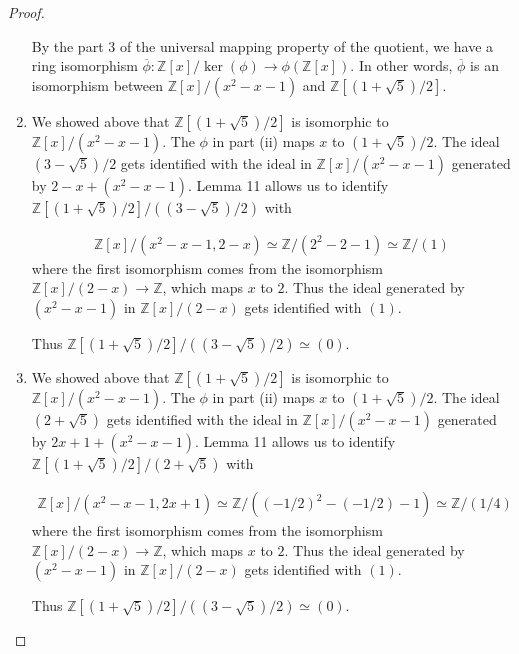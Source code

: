 \documentclass[12pt, psamsfonts]{amsart}
\theoremstyle{definition}
\theoremstyle{remark}
\numberwithin{equation}{section}
\begin{document}
\begin{proof}
\begin{enumerate}
      By the part 3 of the universal mapping property of the quotient, we have a ring isomorphism $\overline{\phi}: \mathbb{Z}[x]/\ker(\phi) \rightarrow \phi(\mathbb{Z}[x])$.
      In other words, $\overline{\phi}$ is an isomorphism between $\mathbb{Z}[x]/(x^2 - x- 1)$ and $\mathbb{Z}[(1 + \sqrt{5})/2]$.
    \item
      We showed above that $\mathbb{Z}[(1 + \sqrt{5})/2]$ is isomorphic to $\mathbb{Z}[x]/(x^2 - x - 1)$.
      The $\phi$ in part (ii)  maps $x$ to $(1 + \sqrt{5}) / 2$.
      The ideal $(3 - \sqrt{5}) / 2$ gets identified with the ideal in $\mathbb{Z}[x]/(x^2 - x - 1)$ generated by $2 - x + (x^2 - x - 1)$.
      Lemma 11 allows us to identify $\mathbb{Z}[(1 + \sqrt{5})/2]/((3 - \sqrt{5})/2)$ with

      \begin{align*}
        \mathbb{Z}[x]/(x^2 - x - 1, 2 - x) \simeq \mathbb{Z}/(2^2 - 2 - 1) \simeq \mathbb{Z}/(1)
      \end{align*}
      where the first isomorphism comes from the isomorphism $\mathbb{Z}[x] / (2 - x) \rightarrow \mathbb{Z}$, which maps $x$ to $2$.
      Thus the ideal generated by $(x^2 - x - 1)$ in $\mathbb{Z}[x]/(2 - x)$ gets identified with $(1)$.

      Thus $\mathbb{Z}[(1 + \sqrt{5})/2]/((3 - \sqrt{5})/2) \simeq (0)$.
    \item
      We showed above that $\mathbb{Z}[(1 + \sqrt{5})/2]$ is isomorphic to $\mathbb{Z}[x]/(x^2 - x - 1)$.
      The $\phi$ in part (ii)  maps $x$ to $(1 + \sqrt{5}) / 2$.
      The ideal $(2 + \sqrt{5})$ gets identified with the ideal in $\mathbb{Z}[x]/(x^2 - x - 1)$ generated by $2x + 1 + (x^2 - x - 1)$.
      Lemma 11 allows us to identify $\mathbb{Z}[(1 + \sqrt{5})/2]/(2 + \sqrt{5})$ with

      \begin{align*}
        \mathbb{Z}[x]/(x^2 - x - 1, 2x + 1) \simeq \mathbb{Z}/((-1/2)^2 - (-1/2) - 1) \simeq \mathbb{Z}/(1/4)
      \end{align*}
      where the first isomorphism comes from the isomorphism $\mathbb{Z}[x] / (2 - x) \rightarrow \mathbb{Z}$, which maps $x$ to $2$.
      Thus the ideal generated by $(x^2 - x - 1)$ in $\mathbb{Z}[x]/(2 - x)$ gets identified with $(1)$.

      Thus $\mathbb{Z}[(1 + \sqrt{5})/2]/((3 - \sqrt{5})/2) \simeq (0)$.

  \end{enumerate}
\end{proof}
\end{document}
